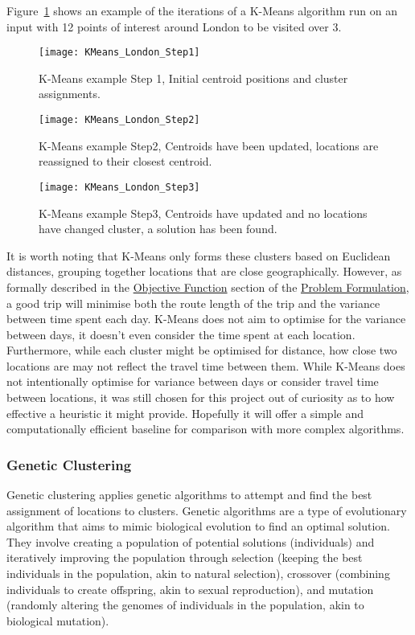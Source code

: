 \noindent
Figure~\ref{fig:KMeans_London_Step1} shows an example of the iterations of a K-Means algorithm run on an input with 12
points of interest around London to be visited over 3.
\begin{figure}[H]
    \ContinuedFloat*
    \texttt{[image: KMeans\_London\_Step1]}
    \caption{K-Means example Step 1, Initial centroid positions and cluster assignments.}
    \label{fig:KMeans_London_Step1}
\end{figure}
\begin{figure}[H]
    \ContinuedFloat
    \texttt{[image: KMeans\_London\_Step2]}
    \caption{K-Means example Step2, Centroids have been updated, locations are reassigned to their closest centroid.}
    \label{fig:KMeans_London_Step2}
\end{figure}
\begin{figure}[H]
    \ContinuedFloat
    \texttt{[image: KMeans\_London\_Step3]}
    \caption{K-Means example Step3, Centroids have updated and no locations have changed cluster, a solution has been found.}
    \label{fig:KMeans_London_Step3}
\end{figure}

\noindent
It is worth noting that K-Means only forms these clusters based on Euclidean distances, grouping together locations
that are close geographically.
However, as formally described in the \hyperref[subsec:objective-function]{Objective Function} section of the
\hyperref[sec:problem-formulation]{Problem Formulation}, a good trip will minimise both the route length of the trip
and the variance between time spent each day.
K-Means does not aim to optimise for the variance between days, it doesn't even consider the time spent at each
location.
Furthermore, while each cluster might be optimised for distance, how close two locations are may not reflect the travel
time between them.
While K-Means does not intentionally optimise for variance between days or consider travel time between locations, it
was still chosen for this project out of curiosity as to how effective a heuristic it might provide.
Hopefully it will offer a simple and computationally efficient baseline for comparison with more complex
algorithms.

\subsubsection{Genetic Clustering}
Genetic clustering applies genetic algorithms to attempt and find the best assignment of locations to clusters.
Genetic algorithms are a type of evolutionary algorithm that aims to mimic biological evolution to find an optimal
solution.
They involve creating a population of potential solutions (individuals) and iteratively improving the population
through selection (keeping the best individuals in the population, akin to natural selection), crossover (combining
individuals to create offspring, akin to sexual reproduction), and mutation (randomly altering the genomes
of individuals in the population, akin to biological mutation).

